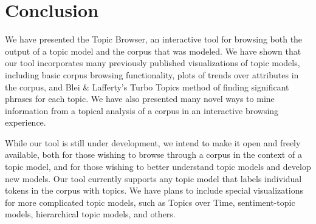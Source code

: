 \documentclass{article}
\begin{document}
\section{Conclusion}

We have presented the Topic Browser, an interactive tool for browsing both the
output of a topic model and the corpus that was modeled.  We have shown that
our tool incorporates many previously published visualizations of topic models,
including basic corpus browsing functionality, plots of trends over attributes
in the corpus, and Blei \& Lafferty's Turbo Topics method of finding
significant phrases for each topic.  We have also presented many novel ways to
mine information from a topical analysis of a corpus in an interactive browsing
experience.

While our tool is still under development, we intend to make it open and freely
available, both for those wishing to browse through a corpus in the context of
a topic model, and for those wishing to better understand topic models and
develop new models.  Our tool currently supports any topic model that labels
individual tokens in the corpus with topics.  We have plans to include special
visualizations for more complicated topic models, such as Topics over Time,
sentiment-topic models, hierarchical topic models, and others.



\end{document}
